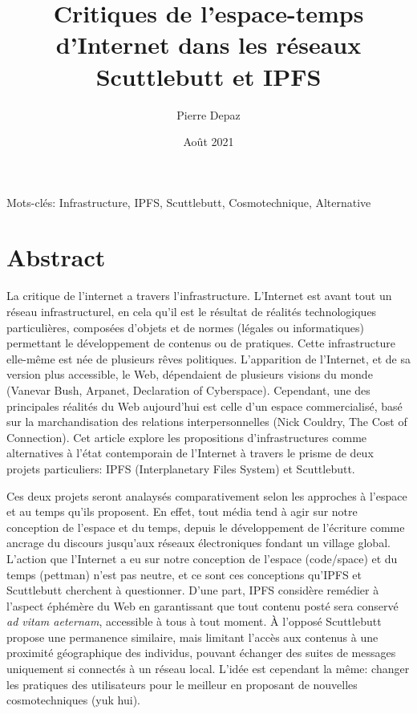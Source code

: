 \documentclass{article}
\begin{document}
\title{Critiques de l'espace-temps d'Internet dans les réseaux Scuttlebutt et IPFS}
\author{Pierre Depaz}
\date{Août 2021}
\maketitle

Mots-clés: Infrastructure, IPFS, Scuttlebutt, Cosmotechnique, Alternative

\section{Abstract}

La critique de l'internet a travers l'infrastructure. L'Internet est avant tout un réseau infrastructurel, en cela qu'il est le résultat de réalités technologiques particulières, composées d'objets et de normes (légales ou informatiques) permettant le développement de contenus ou de pratiques. Cette infrastructure elle-même est née de plusieurs rêves politiques. L'apparition de l'Internet, et de sa version plus accessible, le Web, dépendaient de plusieurs visions du monde (Vanevar Bush, Arpanet, Declaration of Cyberspace). Cependant, une des principales réalités du Web aujourd'hui est celle d'un espace commercialisé, basé sur la marchandisation des relations interpersonnelles (Nick Couldry, The Cost of Connection). Cet article explore les propositions d'infrastructures comme alternatives à l'état contemporain de l'Internet à travers le prisme de deux projets particuliers: IPFS (Interplanetary Files System) et Scuttlebutt.

Ces deux projets seront analaysés comparativement selon les approches à l'espace et au temps qu'ils proposent. En effet, tout média tend à agir sur notre conception de l'espace et du temps, depuis le développement de l'écriture comme ancrage du discours jusqu'aux réseaux électroniques fondant un village global. L'action que l'Internet a eu sur notre conception de l'espace (code/space) et du temps (pettman) n'est pas neutre, et ce sont ces conceptions qu'IPFS et Scuttlebutt cherchent à questionner. D'une part, IPFS\cite{benet_ipfs_2014} considère remédier à l'aspect éphémère du Web en garantissant que tout contenu posté sera conservé \emph{ad vitam aeternam}, accessible à tous à tout moment. À l'opposé Scuttlebutt propose une permanence similaire, mais limitant l'accès aux contenus à une proximité géographique des individus, pouvant échanger des suites de messages uniquement si connectés à un réseau local. L'idée est cependant la même: changer les pratiques des utilisateurs pour le meilleur en proposant de nouvelles cosmotechniques (yuk hui).
\end{document}
